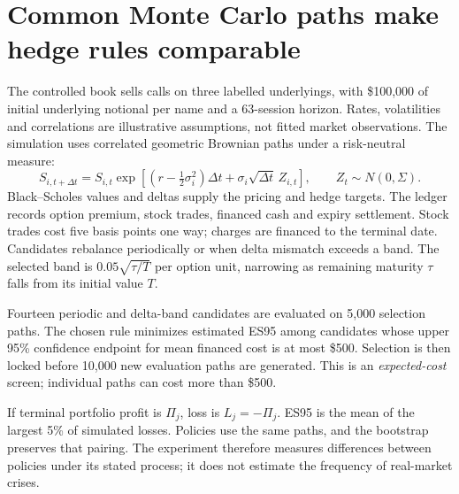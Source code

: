 \documentclass[11pt,a4paper]{article}
\begin{document}

\nextpage
\section*{Common Monte Carlo paths make hedge rules comparable}
The controlled book sells calls on three labelled underlyings, with \$100,000 of initial underlying notional per name and a 63-session horizon. Rates, volatilities and correlations are illustrative assumptions, not fitted market observations. The simulation uses correlated geometric Brownian paths under a risk-neutral measure:
\[
S_{i,t+\Delta t}=S_{i,t}\exp\!\left[(r-\tfrac12\sigma_i^2)\Delta t+\sigma_i\sqrt{\Delta t}\,Z_{i,t}\right],
\qquad Z_t\sim N(0,\Sigma).
\]
Black--Scholes values and deltas supply the pricing and hedge targets. The ledger records option premium, stock trades, financed cash and expiry settlement. Stock trades cost five basis points one way; charges are financed to the terminal date. Candidates rebalance periodically or when delta mismatch exceeds a band. The selected band is $0.05\sqrt{\tau/T}$ per option unit, narrowing as remaining maturity $\tau$ falls from its initial value $T$.

Fourteen periodic and delta-band candidates are evaluated on 5,000 selection paths. The chosen rule minimizes estimated ES95 among candidates whose upper 95\% confidence endpoint for mean financed cost is at most \$500. Selection is then locked before 10,000 new evaluation paths are generated. This is an \emph{expected-cost} screen; individual paths can cost more than \$500.

If terminal portfolio profit is $\Pi_j$, loss is $L_j=-\Pi_j$. ES95 is the mean of the largest 5\% of simulated losses. Policies use the same paths, and the bootstrap preserves that pairing. The experiment therefore measures differences between policies under its stated process; it does not estimate the frequency of real-market crises.

\end{document}
